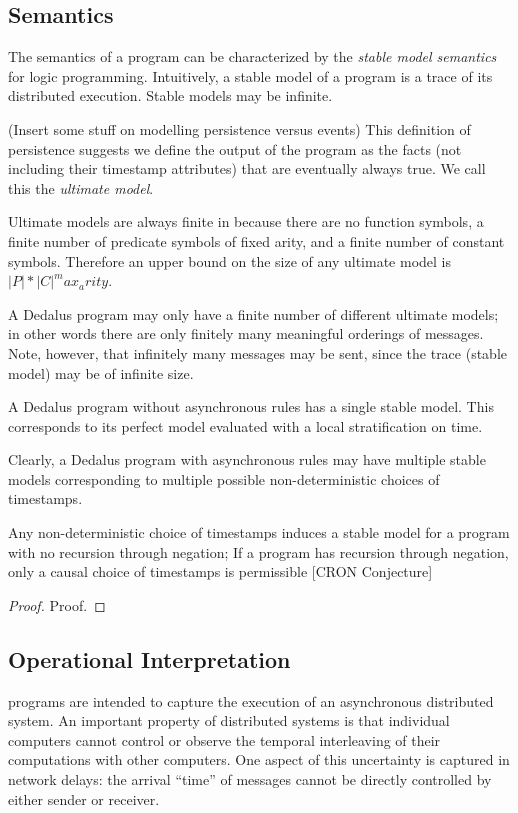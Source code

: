 \subsection{Semantics}
The semantics of a \lang program can be characterized by the {\em stable model semantics} for logic programming.  Intuitively, a stable model of a \lang program is a trace of its distributed execution.  Stable models may be infinite.

(Insert some stuff on modelling persistence versus events)
This definition of persistence suggests we define the output of the program as the facts (not including their timestamp attributes) that are eventually always true.  We call this the {\em ultimate model}.

Ultimate models are always finite in \dedalus because there are no function symbols, a finite number of predicate symbols of fixed arity, and a finite number of constant symbols.  Therefore an upper bound on the size of any ultimate model is $|P| * |C| ^ max_arity$.

A Dedalus program may only have a finite number of different ultimate models; in other words there are only finitely many meaningful orderings of messages.  Note, however, that infinitely many messages may be sent, since the trace (stable model) may be of infinite size.

A Dedalus program without asynchronous rules has a single stable model.  This corresponds to its perfect model evaluated with a local stratification on time.

Clearly, a Dedalus program with asynchronous rules may have multiple stable models corresponding to multiple possible non-deterministic choices of timestamps.

\begin{lemma}
Any non-deterministic choice of timestamps induces a stable model for a \lang program with no recursion through negation; If a \lang program has recursion through negation, only a causal choice of timestamps is permissible [CRON Conjecture]
\end{lemma}
\begin{proof}
Proof.
\end{proof}

\subsection{Operational Interpretation}
\lang programs are intended to capture the execution of an asynchronous distributed system.  An important property of distributed systems is that individual computers cannot control or observe the temporal interleaving of their computations with other computers.  One aspect of this uncertainty is captured in network delays: the arrival ``time'' of messages cannot be directly controlled by either sender or receiver.

